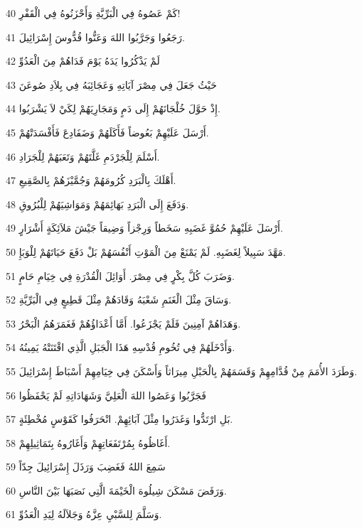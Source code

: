 \par 40 كَمْ عَصُوهُ فِي الْبَرِّيَّةِ وَأَحْزَنُوهُ فِي الْقَفْرِ!
\par 41 رَجَعُوا وَجَرَّبُوا اللهَ وَعَنُّوا قُدُّوسَ إِسْرَائِيلَ.
\par 42 لَمْ يَذْكُرُوا يَدَهُ يَوْمَ فَدَاهُمْ مِنَ الْعَدُوِّ
\par 43 حَيْثُ جَعَلَ فِي مِصْرَ آيَاتِهِ وَعَجَائِبَهُ فِي بِلاَدِ صُوعَنَ
\par 44 إِذْ حَوَّلَ خُلْجَانَهُمْ إِلَى دَمٍ وَمَجَارِيَهُمْ لِكَيْ لاَ يَشْرَبُوا.
\par 45 أَرْسَلَ عَلَيْهِمْ بَعُوضاً فَأَكَلَهُمْ وَضَفَادِعَ فَأَفْسَدَتْهُمْ.
\par 46 أَسْلَمَ لِلْجَرْدَمِ غَلَّتَهُمْ وَتَعَبَهُمْ لِلْجَرَادِ.
\par 47 أَهْلَكَ بِالْبَرَدِ كُرُومَهُمْ وَجُمَّيْزَهُمْ بِالصَّقِيعِ.
\par 48 وَدَفَعَ إِلَى الْبَرَدِ بَهَائِمَهُمْ وَمَوَاشِيَهُمْ لِلْبُرُوقِ.
\par 49 أَرْسَلَ عَلَيْهِمْ حُمُوَّ غَضَبِهِ سَخَطاً وَرِجْزاً وَضِيقاً جَيْشَ مَلاَئِكَةٍ أَشْرَارٍ.
\par 50 مَهَّدَ سَبِيلاً لِغَضَبِهِ. لَمْ يَمْنَعْ مِنَ الْمَوْتِ أَنْفُسَهُمْ بَلْ دَفَعَ حَيَاتَهُمْ لِلْوَبَإِ.
\par 51 وَضَرَبَ كُلَّ بِكْرٍ فِي مِصْرَ. أَوَائِلَ الْقُدْرَةِ فِي خِيَامِ حَامٍ.
\par 52 وَسَاقَ مِثْلَ الْغَنَمِ شَعْبَهُ وَقَادَهُمْ مِثْلَ قَطِيعٍ فِي الْبَرِّيَّةِ.
\par 53 وَهَدَاهُمْ آمِنِينَ فَلَمْ يَجْزَعُوا. أَمَّا أَعْدَاؤُهُمْ فَغَمَرَهُمُ الْبَحْرُ.
\par 54 وَأَدْخَلَهُمْ فِي تُخُومِ قُدْسِهِ هَذَا الْجَبَلِ الَّذِي اقْتَنَتْهُ يَمِينُهُ.
\par 55 وَطَرَدَ الأُمَمَ مِنْ قُدَّامِهِمْ وَقَسَمَهُمْ بِالْحَبْلِ مِيرَاثاً وَأَسْكَنَ فِي خِيَامِهِمْ أَسْبَاطَ إِسْرَائِيلَ.
\par 56 فَجَرَّبُوا وَعَصُوا اللهَ الْعَلِيَّ وَشَهَادَاتِهِ لَمْ يَحْفَظُوا
\par 57 بَلِ ارْتَدُّوا وَغَدَرُوا مِثْلَ آبَائِهِمْ. انْحَرَفُوا كَقَوْسٍ مُخْطِئَةٍ.
\par 58 أَغَاظُوهُ بِمُرْتَفَعَاتِهِمْ وَأَغَارُوهُ بِتَمَاثِيلِهِمْ.
\par 59 سَمِعَ اللهُ فَغَضِبَ وَرَذَلَ إِسْرَائِيلَ جِدّاً
\par 60 وَرَفَضَ مَسْكَنَ شِيلُوهَ الْخَيْمَةَ الَّتِي نَصَبَهَا بَيْنَ النَّاسِ.
\par 61 وَسَلَّمَ لِلسَّبْيِ عِزَّهُ وَجَلاَلَهُ لِيَدِ الْعَدُوِّ.
